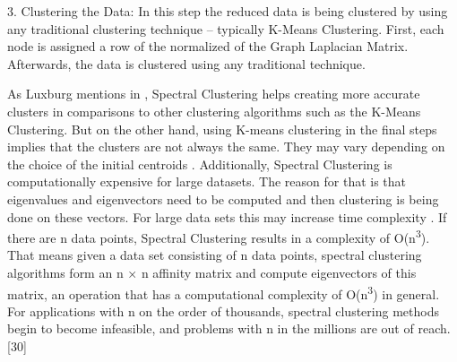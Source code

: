 3.	Clustering the Data: In this step the reduced data is being clustered by using any traditional clustering technique – typically K-Means Clustering. First, each node is assigned a row of the normalized of the Graph Laplacian Matrix. Afterwards, the data is clustered using any traditional technique. \newline

As Luxburg mentions in \cite{von2007tutorial}, Spectral Clustering helps creating more accurate clusters in comparisons to other clustering algorithms such as the K-Means Clustering. But on the other hand, using K-means clustering in the final steps implies that the clusters are not always the same. They may vary depending on the choice of the initial centroids \cite{spectral-website}. Additionally, Spectral Clustering is computationally expensive for large datasets. The reason for that is that eigenvalues and eigenvectors need to be computed and then clustering is being done on these vectors. For large data sets this may increase time complexity \cite{spectral-website}. \newline
If there are n data points, Spectral Clustering results in a complexity of O(n\textsuperscript{3}). That means  given a data set consisting of n data points, spectral clustering algorithms form an n × n affinity matrix and compute eigenvectors of this matrix, an operation that has a computational complexity of O(n\textsuperscript{3}) in general. For applications with n on the order of thousands, spectral clustering methods begin to become infeasible, and problems with n in the millions are out of reach. [30] \newline
